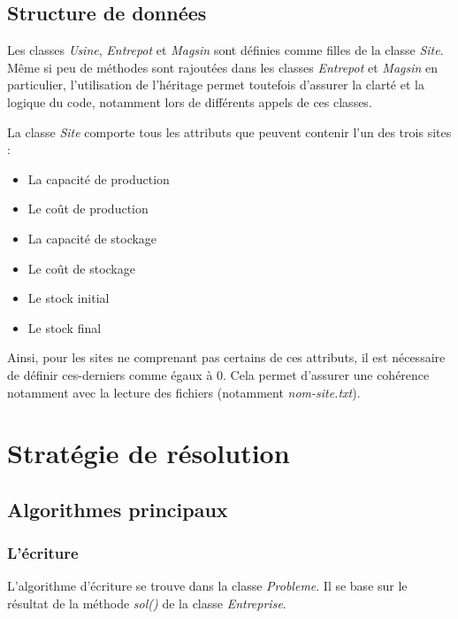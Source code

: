 \documentclass[12pt, a4paper]{article}
\begin{document}
\subsection{Structure de données}

Les classes \emph{Usine}, \emph{Entrepot} et \emph{Magsin} sont définies comme filles de la classe \emph{Site}. Même si peu de méthodes sont rajoutées dans les classes \emph{Entrepot} et \emph{Magsin} en particulier, l'utilisation de l'héritage permet toutefois d'assurer la clarté et la logique du code, notamment lors de différents appels de ces classes.

La classe \emph{Site} comporte tous les attributs que peuvent contenir l'un des trois sites :
\begin{itemize}
\item La capacité de production
\item Le coût de production
\item La capacité de stockage
\item Le coût de stockage
\item Le stock initial
\item Le stock final
\end{itemize}
Ainsi, pour les sites ne comprenant pas certains de ces attributs, il est nécessaire de définir ces-derniers comme égaux à 0. Cela permet d'assurer une cohérence notamment avec la lecture des fichiers (notamment \emph{nom-site.txt}).


\section{Stratégie de résolution}
\subsection{Algorithmes principaux}

\subsubsection{L'écriture}
L'algorithme d'écriture se trouve dans la classe \emph{Probleme}. Il se base sur le résultat de la méthode \emph{sol()} de la classe \emph{Entreprise}.
\end{document}
